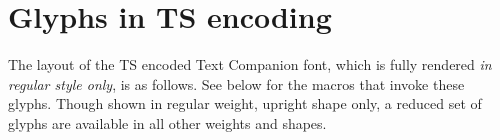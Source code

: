 \documentclass{article}
\begin{document}
\section{Glyphs in TS encoding}
The layout of the TS encoded Text Companion font, which is fully rendered \emph{in regular style only}, is as follows. See below for the macros that invoke these glyphs. Though shown in regular weight, upright shape only, a reduced set of  glyphs are available in all other weights and shapes.

\end{document}
